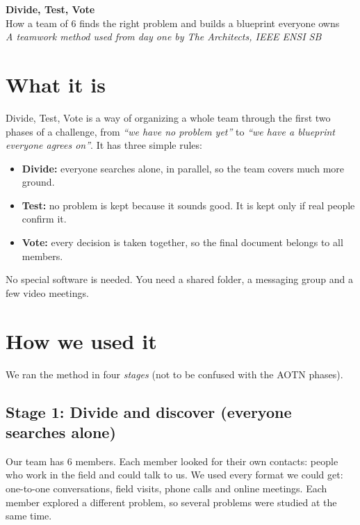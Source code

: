 \documentclass[11pt,a4paper]{article}
\begin{document}
\begin{center}
{\LARGE\bfseries Divide, Test, Vote}\\[0.5em]
{\large How a team of 6 finds the right problem and builds a blueprint everyone owns}\\[0.5em]
{\itshape A teamwork method used from day one by The Architects, IEEE ENSI SB}
\end{center}
\vspace{0.2em}


\section{What it is}

Divide, Test, Vote is a way of organizing a whole team through the first two phases of a challenge, from \emph{``we have no problem yet''} to \emph{``we have a blueprint everyone agrees on''}. It has three simple rules:

\begin{itemize}
  \item \textbf{Divide:} everyone searches alone, in parallel, so the team covers much more ground.
  \item \textbf{Test:} no problem is kept because it sounds good. It is kept only if real people confirm it.
  \item \textbf{Vote:} every decision is taken together, so the final document belongs to all members.
\end{itemize}

No special software is needed. You need a shared folder, a messaging group and a few video meetings.

\section{How we used it}

We ran the method in four \emph{stages} (not to be confused with the AOTN phases).

\subsection{Stage 1: Divide and discover (everyone searches alone)}
Our team has 6 members. Each member looked for their own contacts: people who work in the field and could talk to us. We used every format we could get: one-to-one conversations, field visits, phone calls and online meetings. Each member explored a different problem, so several problems were studied at the same time.
\end{document}
